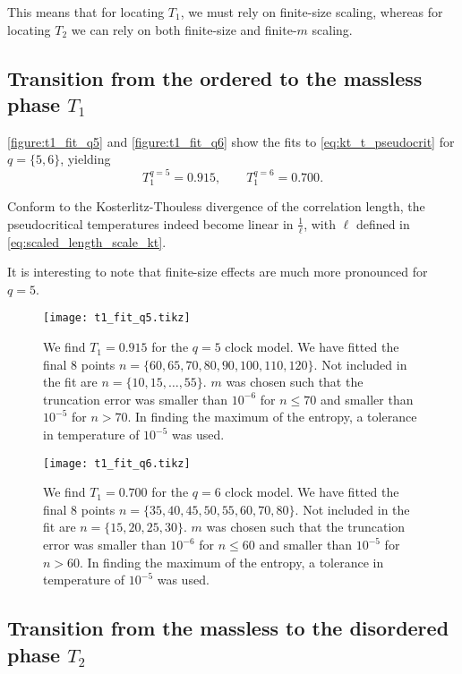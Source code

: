 This means that for locating $T_1$, we must rely on finite-size scaling,
whereas for locating $T_2$ we can rely on both finite-size and finite-$m$ scaling.

\subsection{Transition from the ordered to the massless phase $T_1$}

\autoref{figure:t1_fit_q5} and \autoref{figure:t1_fit_q6} show the fits to \autoref{eq:kt_t_pseudocrit} for $q = \{ 5,
6\}$, yielding
\begin{equation}
  T_1^{q = 5} = 0.915, \qquad T_1^{q = 6} = 0.700.
\end{equation}

Conform to the Kosterlitz-Thouless divergence of the correlation length,
the pseudocritical temperatures indeed become linear in $\frac{1}{\ell}$,
with $\ell$ defined in \autoref{eq:scaled_length_scale_kt}.

It is interesting to note that finite-size effects are much more pronounced for $q = 5$.

\begin{figure}
  \centering
  \texttt{[image: t1\_fit\_q5.tikz]}
  \caption{We find $T_1 = 0.915$ for the $q = 5$ clock model.
  We have fitted the final 8 points $n = \{ 60, 65, 70, 80, 90,
  100, 110, 120 \}$. Not included in the fit are $n = \{ 10, 15, \dots, 55 \}$.
  $m$ was chosen such that the truncation error was smaller than $10^{-6}$ for $n \leq 70$ and smaller than $10^{-5}$
  for $n > 70$.
  In finding the maximum of the entropy, a tolerance in temperature of $10^{-5}$ was used.
  }\label{figure:t1_fit_q5}
\end{figure}

\begin{figure}
  \centering
  \texttt{[image: t1\_fit\_q6.tikz]}
  \caption{We find $T_1 = 0.700$ for the $q = 6$ clock model.
  We have fitted the final 8 points $n = \{ 35, 40, 45, 50, 55,
  60, 70, 80 \}$.
  Not included in the fit are $n = \{ 15, 20, 25, 30 \}$.
  $m$ was chosen such that the truncation error was smaller than $10^{-6}$ for $n \leq 60$ and smaller than $10^{-5}$
  for $n > 60$.
  In finding the maximum of the entropy, a tolerance in temperature of $10^{-5}$ was used.
  }\label{figure:t1_fit_q6}
\end{figure}

\subsection{Transition from the massless to the disordered phase $T_2$}

